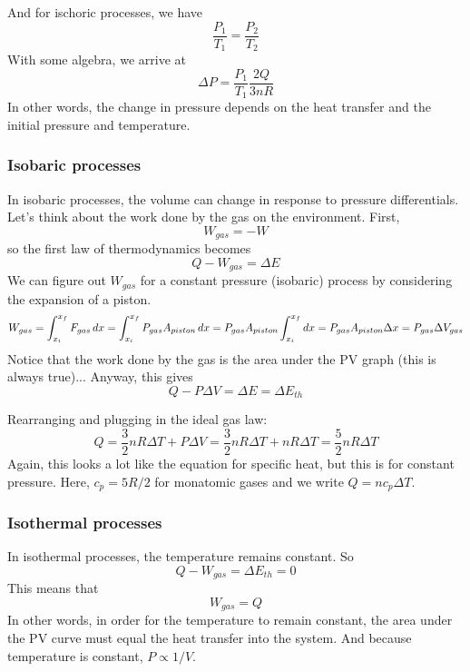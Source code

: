And for ischoric processes, we have
$$\frac{P_1}{T_1}=\frac{P_2}{T_2}$$
With some algebra, we arrive at
$$\Delta{P}=\frac{P_1}{T_1}\frac{2Q}{3nR}$$
In other words, the change in pressure depends on the heat transfer and the initial pressure and temperature.

\subsubsection{Isobaric processes}
In isobaric processes, the volume can change in response to pressure differentials. Let's think about the work done by the gas on the environment. First,
$$W_{gas}=-W$$
so the first law of thermodynamics becomes
$$Q-W_{gas}=\Delta{E}$$
We can figure out $W_{gas}$ for a constant pressure (isobaric) process by considering the expansion of a piston.
$$W_{gas}=\displaystyle\int_{x_i}^{x_f}F_{gas}\,dx=\int_{x_i}^{x_f}P_{gas}A_{piston}\,dx=P_{gas}A_{piston}\int_{x_i}^{x_f}dx=P_{gas}A_{piston}\Delta{x}=P_{gas}\Delta{V_{gas}}$$
Notice that the work done by the gas is the area under the PV graph (this is always true)... Anyway, this gives
$$Q-P\Delta{V}=\Delta{E}=\Delta{E_{th}}$$



Rearranging and plugging in the ideal gas law:
$$Q=\frac{3}{2}nR\Delta{T}+P\Delta{V}=\frac{3}{2}nR\Delta{T}+nR\Delta{T}=\frac{5}{2}nR\Delta{T}$$
Again, this looks a lot like the equation for specific heat, but this is for constant pressure. Here, $c_p=5R/2$ for monatomic gases and we write $Q=nc_p\Delta{T}$.

\subsubsection{Isothermal processes}
In isothermal processes, the temperature remains constant. So
$$Q-W_{gas}=\Delta{E_{th}}=0$$
This means that 
$$W_{gas}=Q$$
In other words, in order for the temperature to remain constant, the area under the PV curve must equal the heat transfer into the system. And because temperature is constant, $P\propto{1/V}$.

